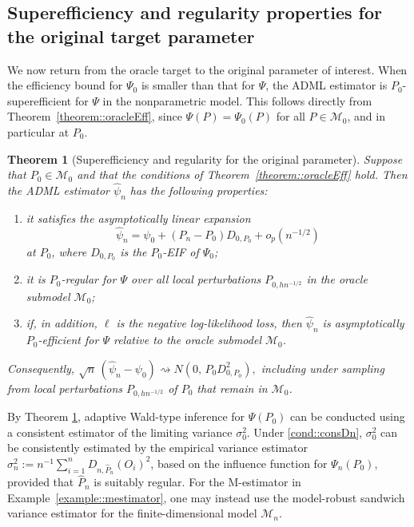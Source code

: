 \documentclass[11pt]{article}
\newtheorem{theorem}{Theorem}
\theoremstyle{definition}
\begin{document}
 

 


  
\subsection{Superefficiency and regularity properties for the original target parameter}
\label{section::oracleParamInference::original}

We now return from the oracle target to the original parameter of interest. When the efficiency bound for \(\Psi_0\) is smaller than that for \(\Psi\), the ADML estimator is \(P_0\)-superefficient for \(\Psi\) in the nonparametric model. This follows directly from Theorem~\ref{theorem::oracleEff}, since \(\Psi(P)=\Psi_0(P)\) for all \(P\in\mathcal{M}_0\), and in particular at \(P_0\).
 

 

 
\begin{theorem}[Superefficiency and regularity for the original parameter]
\label{theorem::oracleRegularity}
Suppose that \(P_0 \in \mathcal{M}_0\) and that the conditions of Theorem~\ref{theorem::oracleEff} hold. Then the ADML estimator \(\widehat{\psi}_n\) has the following properties:
\begin{enumerate}
    \item[(i)] it satisfies the asymptotically linear expansion
    \[
    \widehat{\psi}_n = \psi_0 + (P_n - P_0) D_{0,P_0} + o_p(n^{-1/2})
    \]
    at \(P_0\), where \(D_{0,P_0}\) is the \(P_0\)-EIF of \(\Psi_0\);

    \item[(ii)] it is \(P_0\)-regular for \(\Psi\) over all local perturbations \(P_{0,hn^{-1/2}}\) in the oracle submodel \(\mathcal{M}_0\);

    \item[(iii)] if, in addition, \(\ell\) is the negative log-likelihood loss, then \(\widehat{\psi}_n\) is asymptotically \(P_0\)-efficient for \(\Psi\) relative to the oracle submodel \(\mathcal{M}_0\).
\end{enumerate}
Consequently, $\sqrt{n}\,(\widehat{\psi}_n - \psi_0) \rightsquigarrow N\!\left(0,\,P_0D_{0,P_0}^2\right),$
including under sampling from local perturbations \(P_{0,hn^{-1/2}}\) of \(P_0\) that remain in \(\mathcal{M}_0\).
\end{theorem}

By Theorem \ref{theorem::oracleRegularity}, adaptive Wald-type inference for \(\Psi(P_0)\) can be conducted using a consistent estimator of the limiting variance \(\sigma_0^2\). Under \ref{cond::consDn}, \(\sigma_0^2\) can be consistently estimated by the empirical variance estimator \(\sigma_n^2 := n^{-1}\sum_{i=1}^{n} D_{n,\widehat P_n}(O_i)^2\), based on the influence function for \(\Psi_n(P_0)\), provided that \(\widehat P_n\) is suitably regular. For the M-estimator in Example~\ref{example::mestimator}, one may instead use the model-robust sandwich variance estimator for the finite-dimensional model \(\mathcal{M}_n\). 
\end{document}
